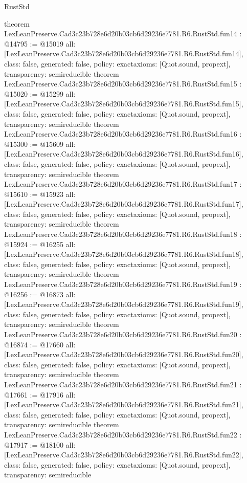 \begin{lexlean}{RustStd}
\begin{coremodule}
{}
theorem LexLeanPreserve.Cad3c23b728e6d20b03cb6d29236e7781.R6.RustStd.fun14 : @14795 := @15019 {
  all: [LexLeanPreserve.Cad3c23b728e6d20b03cb6d29236e7781.R6.RustStd.fun14],
  class: false,
  generated: false,
  policy: exact{axioms: [Quot.sound, propext]},
  transparency: semireducible
}
theorem LexLeanPreserve.Cad3c23b728e6d20b03cb6d29236e7781.R6.RustStd.fun15 : @15020 := @15299 {
  all: [LexLeanPreserve.Cad3c23b728e6d20b03cb6d29236e7781.R6.RustStd.fun15],
  class: false,
  generated: false,
  policy: exact{axioms: [Quot.sound, propext]},
  transparency: semireducible
}
theorem LexLeanPreserve.Cad3c23b728e6d20b03cb6d29236e7781.R6.RustStd.fun16 : @15300 := @15609 {
  all: [LexLeanPreserve.Cad3c23b728e6d20b03cb6d29236e7781.R6.RustStd.fun16],
  class: false,
  generated: false,
  policy: exact{axioms: [Quot.sound, propext]},
  transparency: semireducible
}
theorem LexLeanPreserve.Cad3c23b728e6d20b03cb6d29236e7781.R6.RustStd.fun17 : @15610 := @15923 {
  all: [LexLeanPreserve.Cad3c23b728e6d20b03cb6d29236e7781.R6.RustStd.fun17],
  class: false,
  generated: false,
  policy: exact{axioms: [Quot.sound, propext]},
  transparency: semireducible
}
theorem LexLeanPreserve.Cad3c23b728e6d20b03cb6d29236e7781.R6.RustStd.fun18 : @15924 := @16255 {
  all: [LexLeanPreserve.Cad3c23b728e6d20b03cb6d29236e7781.R6.RustStd.fun18],
  class: false,
  generated: false,
  policy: exact{axioms: [Quot.sound, propext]},
  transparency: semireducible
}
theorem LexLeanPreserve.Cad3c23b728e6d20b03cb6d29236e7781.R6.RustStd.fun19 : @16256 := @16873 {
  all: [LexLeanPreserve.Cad3c23b728e6d20b03cb6d29236e7781.R6.RustStd.fun19],
  class: false,
  generated: false,
  policy: exact{axioms: [Quot.sound, propext]},
  transparency: semireducible
}
theorem LexLeanPreserve.Cad3c23b728e6d20b03cb6d29236e7781.R6.RustStd.fun20 : @16874 := @17660 {
  all: [LexLeanPreserve.Cad3c23b728e6d20b03cb6d29236e7781.R6.RustStd.fun20],
  class: false,
  generated: false,
  policy: exact{axioms: [Quot.sound, propext]},
  transparency: semireducible
}
theorem LexLeanPreserve.Cad3c23b728e6d20b03cb6d29236e7781.R6.RustStd.fun21 : @17661 := @17916 {
  all: [LexLeanPreserve.Cad3c23b728e6d20b03cb6d29236e7781.R6.RustStd.fun21],
  class: false,
  generated: false,
  policy: exact{axioms: [Quot.sound, propext]},
  transparency: semireducible
}
theorem LexLeanPreserve.Cad3c23b728e6d20b03cb6d29236e7781.R6.RustStd.fun22 : @17917 := @18100 {
  all: [LexLeanPreserve.Cad3c23b728e6d20b03cb6d29236e7781.R6.RustStd.fun22],
  class: false,
  generated: false,
  policy: exact{axioms: [Quot.sound, propext]},
  transparency: semireducible
}
\end{coremodule}
\end{lexlean}
